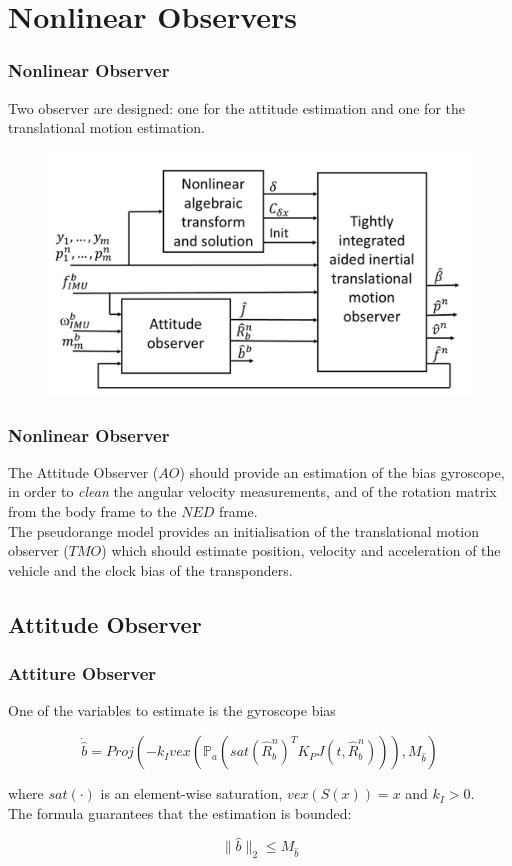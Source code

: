 \documentclass{beamer}
\begin{document}
\section{Nonlinear Observers}
	\begin{frame}
	\frametitle{Nonlinear Observer}
	Two observer are designed: one for the attitude estimation and one for the translational motion estimation. 
		\begin{figure}[H]
		\centering
		\includegraphics[scale=0.3]{observers}
	\end{figure}
	\end{frame}

	\begin{frame}
		\frametitle{Nonlinear Observer}
		The Attitude Observer ($AO$) should provide an estimation of the bias gyroscope, in order to \textit{clean} the angular velocity measurements, and of the rotation matrix from the body frame to the $NED$ frame.\\
		\vspace{0.3cm}
		The pseudorange model provides an initialisation of the translational motion observer ($TMO$) which should estimate position, velocity and acceleration of the vehicle and the clock bias of the transponders.
	\end{frame}
\subsection{Attitude Observer}

	\begin{frame}
		\frametitle{Attiture Observer}
		One of the variables to estimate is the gyroscope bias
		
		\[ \dot{\hat{b}} = Proj(-k_I vex(\mathds{P}_a (sat(\hat{R}^n_b)^T K_P J(t, \hat{R}^n_b))),M_{\hat{b}} )\]
		
		where $sat(\cdot)$ is an element-wise saturation, $vex(S(x)) = x$ and $k_I > 0$.\\
		\vspace{0.3cm}
		The formula guarantees that the estimation is bounded: 
		
		\[\|\hat{b} \|_2 \leqslant M_{\hat{b}} \]	
	\end{frame}
\end{document}
